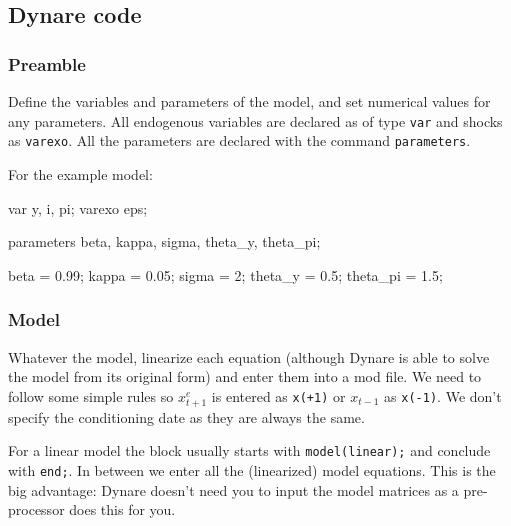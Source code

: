 \documentclass[
  letterpaper,
]{book}
\newenvironment{Shaded}{\begin{snugshade}}{\end{snugshade}}
\newcommand{\FloatTok}[1]{\textcolor[rgb]{0.68,0.00,0.00}{#1}}
\newcommand{\OperatorTok}[1]{\textcolor[rgb]{0.37,0.37,0.37}{#1}}
\newcommand{\VariableTok}[1]{\textcolor[rgb]{0.07,0.07,0.07}{#1}}
\begin{document}
\hypertarget{dynare-code}{%
\subsection{Dynare code}\label{dynare-code}}

\hypertarget{preamble}{%
\subsubsection{Preamble}\label{preamble}}

Define the variables and parameters of the model, and set numerical
values for any parameters. All endogenous variables are declared as of
type \texttt{var} and shocks as \texttt{varexo}. All the parameters are
declared with the command \texttt{parameters}.

For the example model:

\begin{Shaded}
\begin{Highlighting}[]
\VariableTok{var} \VariableTok{y}\OperatorTok{,} \VariableTok{i}\OperatorTok{,} \VariableTok{pi}\OperatorTok{;}
\VariableTok{varexo} \VariableTok{eps}\OperatorTok{;}

\VariableTok{parameters} \VariableTok{beta}\OperatorTok{,} \VariableTok{kappa}\OperatorTok{,} \VariableTok{sigma}\OperatorTok{,} \VariableTok{theta\_y}\OperatorTok{,} \VariableTok{theta\_pi}\OperatorTok{;}

\VariableTok{beta} \OperatorTok{=} \FloatTok{0.99}\OperatorTok{;}
\VariableTok{kappa} \OperatorTok{=} \FloatTok{0.05}\OperatorTok{;}
\VariableTok{sigma} \OperatorTok{=} \FloatTok{2}\OperatorTok{;}
\VariableTok{theta\_y} \OperatorTok{=} \FloatTok{0.5}\OperatorTok{;}
\VariableTok{theta\_pi} \OperatorTok{=} \FloatTok{1.5}\OperatorTok{;}
\end{Highlighting}
\end{Shaded}

\hypertarget{model-1}{%
\subsubsection{Model}\label{model-1}}

Whatever the model, linearize each equation (although Dynare is able to
solve the model from its original form) and enter them into a mod file.
We need to follow some simple rules so \(x^e_{t+1}\) is entered as
\texttt{x(+1)} or \(x_{t-1}\) as \texttt{x(-1)}. We don't specify the
conditioning date as they are always the same.

For a linear model the block usually starts with \texttt{model(linear);}
and conclude with \texttt{end;}. In between we enter all the
(linearized) model equations. This is the big advantage: Dynare doesn't
need you to input the model matrices as a pre-processor does this for
you.
\end{document}
